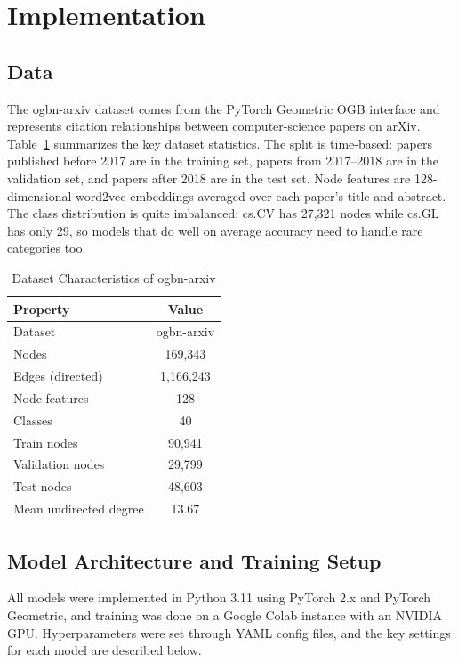 \documentclass[conference]{IEEEtran}
\begin{document}
\section{Implementation}

\subsection{Data}

The ogbn-arxiv dataset comes from the PyTorch Geometric OGB interface and represents
citation relationships between computer-science papers on arXiv. Table~\ref{tab:dataset}
summarizes the key dataset statistics. The split is time-based: papers published before
2017 are in the training set, papers from 2017--2018 are in the validation set, and papers
after 2018 are in the test set. Node features are 128-dimensional word2vec embeddings
averaged over each paper's title and abstract. The class distribution is quite imbalanced:
cs.CV has 27,321 nodes while cs.GL has only 29, so models that do well on average accuracy
need to handle rare categories too.

\begin{table}[h]
\caption{Dataset Characteristics of ogbn-arxiv}
\label{tab:dataset}
\centering
\begin{tabular}{lc}
\toprule
\textbf{Property} & \textbf{Value} \\
\midrule
Dataset & ogbn-arxiv \\
Nodes & 169,343 \\
Edges (directed) & 1,166,243 \\
Node features & 128 \\
Classes & 40 \\
Train nodes & 90,941 \\
Validation nodes & 29,799 \\
Test nodes & 48,603 \\
Mean undirected degree & 13.67 \\
\bottomrule
\end{tabular}
\end{table}

\subsection{Model Architecture and Training Setup}

All models were implemented in Python 3.11 using PyTorch 2.x and PyTorch Geometric, and
training was done on a Google Colab instance with an NVIDIA GPU. Hyperparameters were set
through YAML config files, and the key settings for each model are described below.
\end{document}
